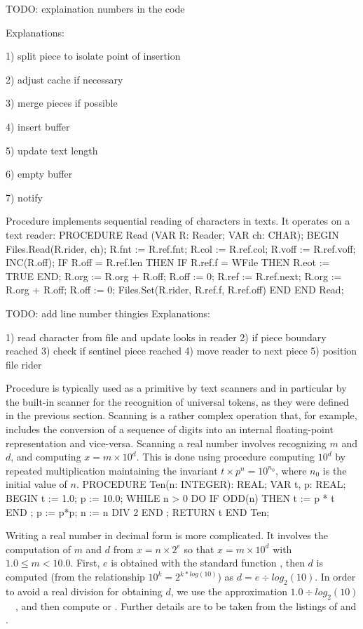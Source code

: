 TODO: explaination numbers in the code

Explanations:

1) split piece to isolate point of insertion

2) adjust cache if necessary

3) merge pieces if possible

4) insert buffer

5) update text length

6) empty buffer

7) notify

\noindent Procedure  implements sequential reading of characters in texts. It operates on a text reader:
\begintt
PROCEDURE Read (VAR R: Reader; VAR ch: CHAR);
BEGIN
  Files.Read(R.rider, ch);
  R.fnt := R.ref.fnt;
  R.col := R.ref.col;
  R.voff := R.ref.voff;
  INC(R.off);
  IF R.off = R.ref.len THEN
    IF R.ref.f = WFile THEN R.eot := TRUE END;
    R.org := R.org + R.off; R.off := 0;
    R.ref := R.ref.next; R.org := R.org + R.off; R.off := 0;
    Files.Set(R.rider, R.ref.f, R.ref.off)
  END
END Read;
\endtt

TODO: add line number thingies
Explanations:

1) read character from file and update looks in reader
2) if piece boundary reached
3) check if sentinel piece reached
4) move reader to next piece
5) position file rider

Procedure  is typically used as a primitive by text
scanners and in particular by the built-in scanner  for the
recognition of universal tokens, as they were defined in the previous
section. Scanning is a rather complex operation that, for example,
includes the conversion of a sequence of digits into an internal
floating-point representation and vice-versa. Scanning a real number
involves recognizing $m$ and $d$, and computing $x = m \times 10^d$.
This is done using procedure  computing $10^d$ by
repeated multiplication maintaining the invariant
$t \times p^n = 10^{n_0}$, where $n_0$ is the initial value of $n$.
\begintt
PROCEDURE Ten(n: INTEGER): REAL;
  VAR t, p: REAL;
BEGIN
  t := 1.0;
  p := 10.0;
  WHILE n > 0 DO
    IF ODD(n) THEN t := p * t END ;
    p := p*p;
    n := n DIV 2
  END ;
  RETURN t
END Ten;
\endtt

\noindent Writing a real number in decimal form is more complicated. It involves the computation of $m$ and $d$ from $x = n \times 2^e$ so that $x = m \times 10^d$ with $1.0 \le m < 10.0$. First, $e$ is obtained with the standard function , then $d$ is computed (from the relationship
$10^k = 2^{k*log(10)}$) as $d = e \div log_2(10)$.
In order to avoid a real division for obtaining $d$,
we use the approximation $1.0 \div log_2(10) $~\equiv~,
and then compute
 or .
Further details are to be taken from the listings of  and .

